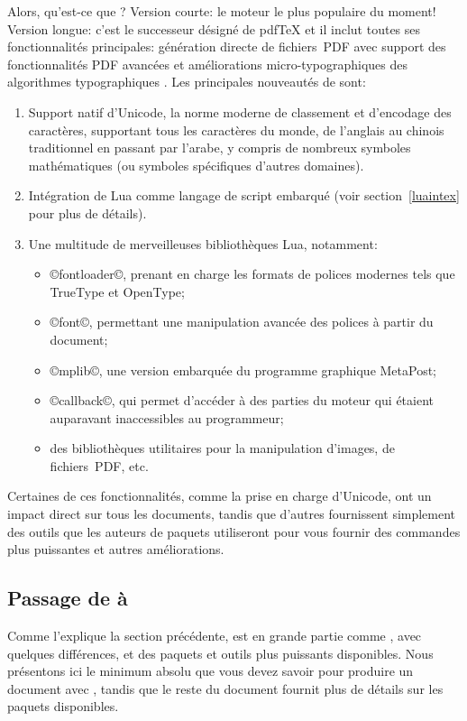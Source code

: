 \documentclass{lltxdoc}
\begin{document}
Alors, qu'est-ce que \luatex? Version courte: le moteur \tex le plus
populaire du moment!
Version longue: c'est le successeur désigné de pdfTeX et il inclut
toutes ses fonctionnalités principales: génération directe de fichiers~PDF
avec support des fonctionnalités PDF avancées et améliorations
micro-typographiques des algorithmes typographiques \tex.
Les principales nouveautés de \luatex sont:
\begin{enumerate}
  \item Support natif d'Unicode, la norme moderne de classement et
    d'encodage des caractères, supportant tous les caractères du monde,
    de l'anglais au chinois traditionnel en passant par l'arabe,
    y compris de nombreux symboles mathématiques (ou symboles
    spécifiques d'autres domaines).
  \item Intégration de Lua comme langage de script embarqué
    (voir section~\ref{luaintex} pour plus de détails).
  \item Une multitude de merveilleuses bibliothèques Lua, notamment:
    \begin{itemize}
      \item ©fontloader©, prenant en charge les formats de polices modernes
        tels que TrueType et OpenType;
      \item ©font©, permettant une manipulation avancée des polices à partir
        du document;
      \item ©mplib©, une version embarquée du programme graphique MetaPost;
      \item ©callback©, qui permet d'accéder à des parties du moteur \tex
        qui étaient auparavant inaccessibles au programmeur;
      \item des bibliothèques utilitaires pour la manipulation d'images,
        de fichiers~PDF, etc.
    \end{itemize}
\end{enumerate}
Certaines de ces fonctionnalités, comme la prise en charge d'Unicode, ont un
impact direct sur tous les documents, tandis que d'autres fournissent simplement
des outils que les auteurs de paquets utiliseront pour vous fournir des commandes
plus puissantes et autres améliorations.


\subsection{Passage de \latex à \lualatex}\label{switch}

Comme l'explique la section précédente, \lualatex{} est en grande partie comme \latex,
avec quelques différences, et des paquets et outils plus puissants disponibles.
Nous présentons ici le minimum absolu que vous devez savoir pour produire
un document avec \lualatex, tandis que le reste du document fournit
plus de détails sur les paquets disponibles.
\end{document}
